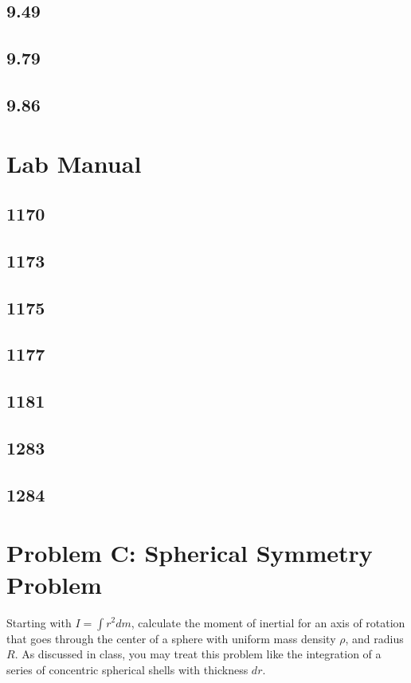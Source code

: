 \documentclass{article}
\begin{document}
\subsection{9.49}

\subsection{9.79}

\subsection{9.86}

\section{Lab Manual}

\subsection{1170}

\subsection{1173}

\subsection{1175}

\subsection{1177}

\subsection{1181}

\subsection{1283}

\subsection{1284}

\section{Problem C: Spherical Symmetry Problem}

Starting with $ I = \int r^2dm $, calculate the moment of inertial for an axis of rotation that goes through the center of a sphere with uniform mass density $ \rho $, and radius $ R $. As discussed in class, you may treat this problem like the integration of a series of concentric spherical shells with thickness $ dr $.
\end{document}
